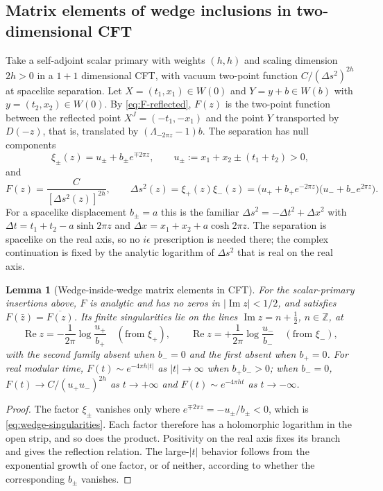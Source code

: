 \documentclass[a4paper,11pt]{article}
\newtheorem{lemma}[theorem]{Lemma}
\theoremstyle{definition}
\begin{document}
\subsection{Matrix elements of wedge inclusions in two-dimensional CFT}\label{subsec:wedge-matrix-elements}

Take a self-adjoint scalar primary with weights $(h,h)$ and scaling dimension $2h>0$ in a $1+1$ dimensional CFT, with vacuum two-point function $C/(\Delta s^2)^{2h}$ at spacelike separation. Let $X=(t_1,x_1)\in W(0)$ and $Y=y+b\in W(b)$ with $y=(t_2,x_2)\in W(0)$. By \eqref{eq:F-reflected}, $F(z)$ is the two-point function between the reflected point $X^J=(-t_1,-x_1)$ and the point $Y$ transported by $D(-z)$, that is, translated by $(\Lambda_{-2\pi z}-1)b$. The separation has null components
\begin{equation}
 \xi_\pm(z)=u_\pm+b_\pm e^{\mp2\pi z},\qquad u_\pm:=x_1+x_2\pm(t_1+t_2)>0 ,
 \label{eq:wedge-separation}
\end{equation}
and
\begin{equation}
 F(z)=\frac{C}{[\Delta s^2(z)]^{2h}},\qquad
 \Delta s^2(z)=\xi_+(z)\xi_-(z)
 =\bigl(u_++b_+e^{-2\pi z}\bigr)\bigl(u_-+b_-e^{2\pi z}\bigr).
 \label{eq:wedge-matrix-element}
\end{equation}
For a spacelike displacement $b_\pm=a$ this is the familiar $\Delta s^2=-\Delta t^2+\Delta x^2$ with $\Delta t=t_1+t_2-a\sinh2\pi z$ and $\Delta x=x_1+x_2+a\cosh2\pi z$. The separation is spacelike on the real axis, so no $i\epsilon$ prescription is needed there; the complex continuation is fixed by the analytic logarithm of $\Delta s^2$ that is real on the real axis.

\begin{lemma}[Wedge-inside-wedge matrix elements in CFT]
\label{lem:wedge-matrix-element}
For the scalar-primary insertions above, $F$ is analytic and has no zeros in $|\operatorname{Im}z|<1/2$, and satisfies $F(\bar z)=\overline{F(z)}$. Its finite singularities lie on the lines $\operatorname{Im}z=n+\tfrac12$, $n\in\mathbb Z$, at
\begin{equation}
 \operatorname{Re}z=-\frac{1}{2\pi}\log\frac{u_+}{b_+}\quad(\text{from }\xi_+),
 \qquad
 \operatorname{Re}z=+\frac{1}{2\pi}\log\frac{u_-}{b_-}\quad(\text{from }\xi_-),
 \label{eq:wedge-singularities}
\end{equation}
with the second family absent when $b_-=0$ and the first absent when $b_+=0$. For real modular time, $F(t)\sim e^{-4\pi h|t|}$ as $|t|\to\infty$ when $b_+b_->0$; when $b_-=0$, $F(t)\to C/(u_+u_-)^{2h}$ as $t\to+\infty$ and $F(t)\sim e^{-4\pi ht}$ as $t\to-\infty$.
\end{lemma}
\begin{proof}
The factor $\xi_\pm$ vanishes only where $e^{\mp2\pi z}=-u_\pm/b_\pm<0$, which is \eqref{eq:wedge-singularities}. Each factor therefore has a holomorphic logarithm in the open strip, and so does the product. Positivity on the real axis fixes its branch and gives the reflection relation. The large-$|t|$ behavior follows from the exponential growth of one factor, or of neither, according to whether the corresponding $b_\pm$ vanishes.
\end{proof}
\end{document}
